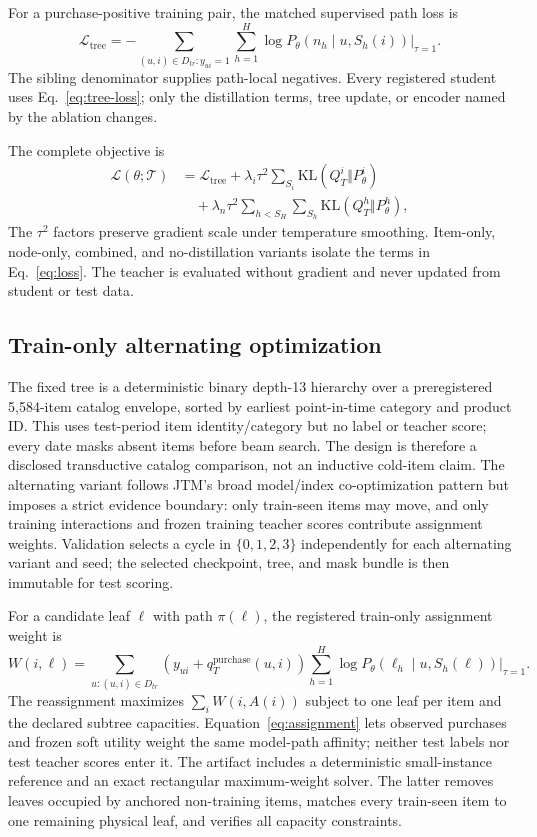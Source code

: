 \documentclass[sigconf,natbib=true]{acmart}
\begin{document}
For a purchase-positive training pair, the matched supervised path loss is
\begin{equation}
\mathcal{L}_{\mathrm{tree}}
=-\sum_{(u,i)\in D_{tr}:y_{ui}=1}\sum_{h=1}^{H}
\log P_\theta(n_h\mid u,S_h(i))\big|_{\tau=1}.
\label{eq:tree-loss}
\end{equation}
The sibling denominator supplies path-local negatives. Every registered student uses Eq.~\ref{eq:tree-loss}; only the distillation terms, tree update, or encoder named by the ablation changes.

The complete objective is
\begin{align}
\mathcal{L}(\theta;\mathcal{T})
&=\mathcal{L}_{\mathrm{tree}}
+\lambda_i\tau^2\!\sum_{S_i}\mathrm{KL}(Q_T^i\Vert P_\theta^i) \nonumber\\
&\quad+\lambda_n\tau^2\!\sum_{h<S_H}\sum_{S_h}
\mathrm{KL}(Q_T^h\Vert P_\theta^h),
\label{eq:loss}
\end{align}
The $\tau^2$ factors preserve gradient scale under temperature smoothing. Item-only, node-only, combined, and no-distillation variants isolate the terms in Eq.~\ref{eq:loss}. The teacher is evaluated without gradient and never updated from student or test data.

\subsection{Train-only alternating optimization}
The fixed tree is a deterministic binary depth-13 hierarchy over a preregistered 5,584-item catalog envelope, sorted by earliest point-in-time category and product ID. This uses test-period item identity/category but no label or teacher score; every date masks absent items before beam search. The design is therefore a disclosed transductive catalog comparison, not an inductive cold-item claim. The alternating variant follows JTM's broad model/index co-optimization pattern but imposes a strict evidence boundary: only train-seen items may move, and only training interactions and frozen training teacher scores contribute assignment weights. Validation selects a cycle in $\{0,1,2,3\}$ independently for each alternating variant and seed; the selected checkpoint, tree, and mask bundle is then immutable for test scoring.

For a candidate leaf $\ell$ with path $\pi(\ell)$, the registered train-only assignment weight is
\begin{equation}
W(i,\ell)=\sum_{u:(u,i)\in D_{tr}}
\left(y_{ui}+q_T^{\mathrm{purchase}}(u,i)\right)
\sum_{h=1}^{H}\log P_\theta(\ell_h\mid u,S_h(\ell))\big|_{\tau=1}.
\label{eq:assignment}
\end{equation}
The reassignment maximizes $\sum_i W(i,A(i))$ subject to one leaf per item and the declared subtree capacities. Equation~\ref{eq:assignment} lets observed purchases and frozen soft utility weight the same model-path affinity; neither test labels nor test teacher scores enter it. The artifact includes a deterministic small-instance reference and an exact rectangular maximum-weight solver. The latter removes leaves occupied by anchored non-training items, matches every train-seen item to one remaining physical leaf, and verifies all capacity constraints.
\end{document}

